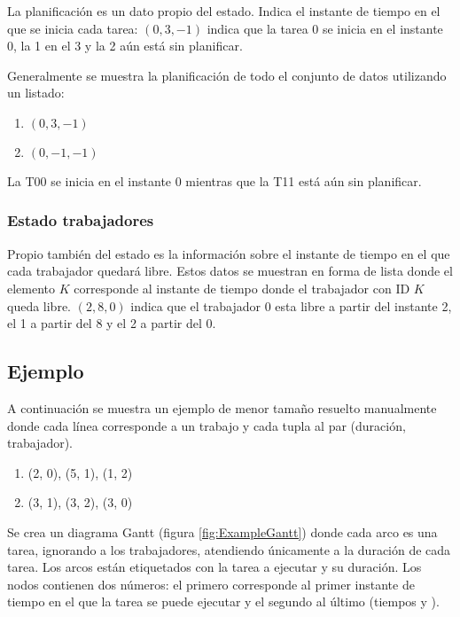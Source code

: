 La planificación es un dato propio del estado.
Indica el instante de tiempo en el que se inicia cada tarea:
$(0, 3, -1)$ indica que la tarea 0 se inicia en el instante 0,
la 1 en el 3 y la 2 aún está sin planificar.

Generalmente se muestra la planificación de todo el conjunto de datos
utilizando un listado:
\begin{enumerate}[start=0, itemsep=0.25px]
    \item $(0, 3, -1)$
    \item $(0, -1, -1)$
\end{enumerate}
La T00 se inicia en el instante 0 mientras que la T11 está aún sin planificar.

\subsubsection{Estado trabajadores}

Propio también del estado es la información sobre
el instante de tiempo en el que cada trabajador quedará libre.
Estos datos se muestran en forma de lista donde el elemento $K$
corresponde al instante de tiempo donde el trabajador con ID $K$
queda libre.
$(2, 8, 0)$ indica que el trabajador 0 esta libre a partir del instante 2,
el 1 a partir del 8 y el 2 a partir del 0.

\pagebreak
\subsection{Ejemplo}
\label{ssec:A*Example}

A continuación se muestra un ejemplo de menor tamaño resuelto manualmente
donde cada línea corresponde a un trabajo y cada tupla al par (duración, trabajador).

\begin{enumerate}[start=0, itemsep=0.25px]
    \item (2, 0), (5, 1), (1, 2)
    \item (3, 1), (3, 2), (3, 0)
\end{enumerate}

Se crea un diagrama Gantt (figura \ref{fig:ExampleGantt}) donde cada arco es una tarea,
ignorando a los trabajadores,
atendiendo únicamente a la duración de cada tarea.
Los arcos están etiquetados con la tarea a ejecutar y su duración.
Los nodos contienen dos números: el primero corresponde al primer instante de tiempo
en el que la tarea se puede ejecutar y el segundo al último
(tiempos  y ).

